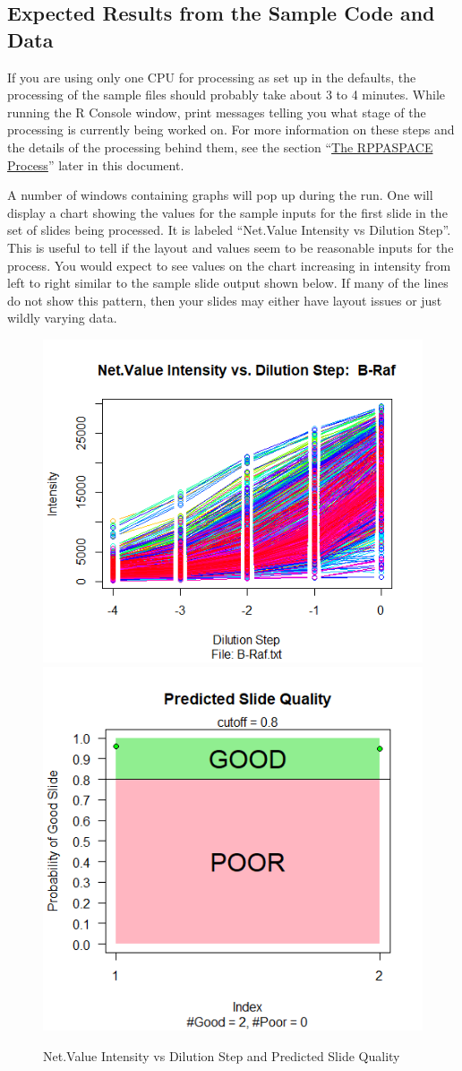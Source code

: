 \documentclass[
]{article}
\begin{document}
\hypertarget{expected-results-from-the-sample-code-and-data}{%
\subsection{Expected Results from the Sample Code and
Data}\label{expected-results-from-the-sample-code-and-data}}

If you are using only one CPU for processing as set up in the defaults,
the processing of the sample files should probably take about 3 to 4
minutes. While running the R Console window, print messages telling you
what stage of the processing is currently being worked on. For more
information on these steps and the details of the processing behind
them, see the section ``\protect\hyperlink{process}{The RPPASPACE
Process}'' later in this document.

A number of windows containing graphs will pop up during the run. One
will display a chart showing the values for the sample inputs for the
first slide in the set of slides being processed. It is labeled
``Net.Value Intensity vs Dilution Step''. This is useful to tell if the
layout and values seem to be reasonable inputs for the process. You
would expect to see values on the chart increasing in intensity from
left to right similar to the sample slide output shown below. If many of
the lines do not show this pattern, then your slides may either have
layout issues or just wildly varying data.

\begin{figure}

{\centering \includegraphics[width=0.49\linewidth]{images/design_check} \includegraphics[width=0.49\linewidth]{images/slide_quality} 

}

\caption{Net.Value Intensity vs Dilution Step and Predicted Slide Quality}\label{fig:unnamed-chunk-2}
\end{figure}
\end{document}
